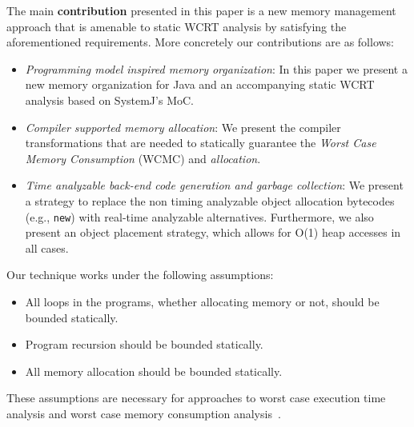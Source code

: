 
The main \textbf{contribution} presented in this paper is a new memory
management approach that is amenable to static WCRT analysis by
satisfying the aforementioned requirements. More concretely our
contributions are as follows:

\begin{itemize}
\item \textit{Programming model inspired memory organization}: In this
  paper we present a new memory organization for Java and an
  accompanying static WCRT analysis based on SystemJ's MoC.
\item \textit{Compiler supported memory allocation}: We present the
  compiler transformations that are needed to statically guarantee the
  \textit{Worst Case Memory Consumption} (WCMC) and \textit{allocation}.
\item \textit{Time analyzable back-end code generation and garbage
    collection}: We present a strategy to replace the non timing
  analyzable object allocation bytecodes (e.g., \texttt{new}) with
  real-time analyzable alternatives. Furthermore, we also present an
  object placement strategy, which allows for O(1) heap accesses in all
  cases.
\end{itemize}

{\color{red}
  
  Our technique works under the following assumptions:
  \begin{itemize}
  \item All loops in the programs, whether allocating memory or not,
    should be bounded statically.
  \item Program recursion should be bounded statically.
  \item All memory allocation should be bounded statically.
  \end{itemize}
  
  These assumptions are necessary for approaches to worst case execution
  time analysis and worst case memory consumption
  analysis~\cite{jop:wcet:jtres06}.

}








